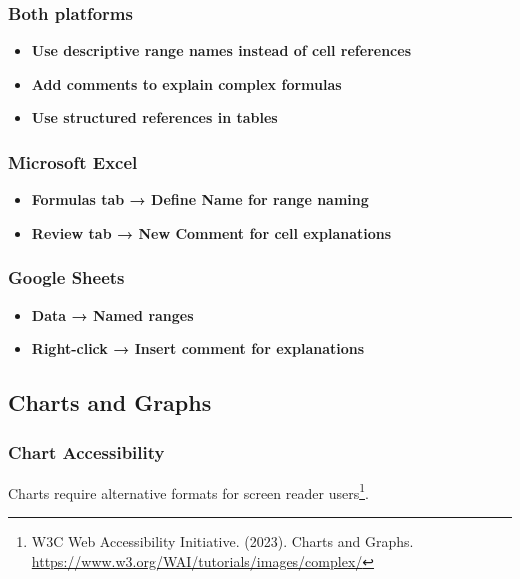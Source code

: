 \subsubsection{Both platforms}
\vspace{1em}
\begin{itemize}
\item \textbf{Use descriptive range names instead of cell references}
\item \textbf{Add comments to explain complex formulas}
\item \textbf{Use structured references in tables}
\end{itemize}
\vspace{1em}

\subsubsection{Microsoft Excel}
\vspace{1em}
\begin{itemize}
\item \textbf{Formulas tab → Define Name for range naming}
\item \textbf{Review tab → New Comment for cell explanations}
\end{itemize}
\vspace{1em}

\subsubsection{Google Sheets}
\vspace{1em}
\begin{itemize}
\item \textbf{Data → Named ranges}
\item \textbf{Right-click → Insert comment for explanations}
\end{itemize}
\vspace{1em}

\subsection{Charts and Graphs}

\subsubsection{Chart Accessibility}
Charts require alternative formats for screen reader users\footnote{W3C Web Accessibility Initiative. (2023). Charts and Graphs. \url{https://www.w3.org/WAI/tutorials/images/complex/}}.

